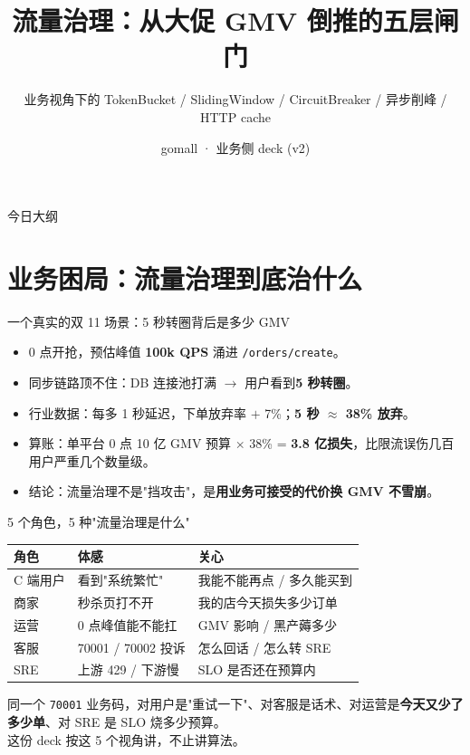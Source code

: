 \documentclass[aspectratio=169,11pt]{beamer}
\title{流量治理：从大促 GMV 倒推的五层闸门}
\subtitle{业务视角下的 TokenBucket / SlidingWindow / CircuitBreaker / 异步削峰 / HTTP cache}
\author{gomall · 业务侧 deck (v2)}
\date{}
\begin{document}
\maketitle

\begin{frame}[shrink]{今日大纲}
\tableofcontents
\end{frame}

\section{业务困局：流量治理到底治什么}

\begin{frame}[shrink]{一个真实的双 11 场景：5 秒转圈背后是多少 GMV}
\begin{itemize}
  \item 0 点开抢，预估峰值 \textbf{100k QPS} 涌进 \texttt{/orders/create}。
  \item 同步链路顶不住：DB 连接池打满 $\to$ 用户看到\textbf{5 秒转圈}。
  \item 行业数据：每多 1 秒延迟，下单放弃率 $+$ 7\%；\textbf{5 秒 $\approx$ 38\% 放弃}。
  \item 算账：单平台 0 点 10 亿 GMV 预算 $\times$ 38\% = \textbf{3.8 亿损失}，比限流误伤几百用户严重几个数量级。
  \item 结论：流量治理不是"挡攻击"，是\textbf{用业务可接受的代价换 GMV 不雪崩}。
\end{itemize}
\end{frame}

\begin{frame}[shrink]{5 个角色，5 种"流量治理是什么"}
\begin{tabular}{@{}lll@{}}
\toprule
角色 & 体感 & 关心 \\
\midrule
C 端用户  & 看到"系统繁忙"        & 我能不能再点 / 多久能买到 \\
商家     & 秒杀页打不开          & 我的店今天损失多少订单 \\
运营     & 0 点峰值能不能扛      & GMV 影响 / 黑产薅多少 \\
客服     & 70001 / 70002 投诉    & 怎么回话 / 怎么转 SRE \\
SRE     & 上游 429 / 下游慢     & SLO 是否还在预算内 \\
\bottomrule
\end{tabular}
\vspace{2mm}
\small 同一个 \texttt{70001} 业务码，对用户是"重试一下"、对客服是话术、对运营是\textbf{今天又少了多少单}、对 SRE 是 SLO 烧多少预算。\\
这份 deck 按这 5 个视角讲，不止讲算法。
\end{frame}
\end{document}
